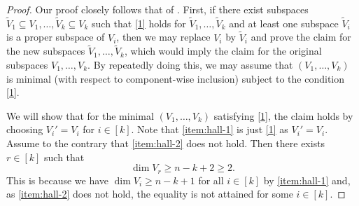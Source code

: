 \documentclass[11pt]{article}
\theoremstyle{plain}
\theoremstyle{definition}
\theoremstyle{remark}
\begin{document}
\begin{proof}
Our proof closely follows that of \cite[Theorem~2]{dau2014existence}.
First, if there exist subspaces $\widetilde{V}_1\subseteq V_1,\dots, \widetilde{V}_k\subseteq V_k$ such that \eqref{1} holds for $\widetilde{V}_1,\dots, \widetilde{V}_k$ and at least one subspace $\widetilde{V}_i$ is a proper subspace of $V_i$, then we may replace $V_i$ by $\widetilde{V}_i$ and prove the claim for the new subspaces $\widetilde{V}_1,\dots, \widetilde{V}_k$, which would imply the claim for the original subspaces $V_1,\dots,V_k$. 
By repeatedly doing this, we may assume that $(V_1,\dots,V_k)$ is minimal (with respect to component-wise inclusion) subject to the condition \eqref{1}.

We will show that for the minimal $(V_1,\dots,V_k)$ satisfying \eqref{1}, the claim holds by choosing $V_i'=V_i$ for $i\in [k]$.
Note that \cref{item:hall-1} is just \eqref{1} as $V_i'=V_i$.
Assume to the contrary that \cref{item:hall-2} does not hold. Then there exists $r\in [k]$ such that
\begin{equation}\label{eq:Vr}
\dim V_r\ge n-k+2\geq 2.
\end{equation}
This is because we have $\dim V_i \geq n-k+1$ for all $i\in [k]$ by \cref{item:hall-1} and, as \cref{item:hall-2} does not hold, the equality is not attained for some $i\in [k]$.


\end{proof}
\end{document}
